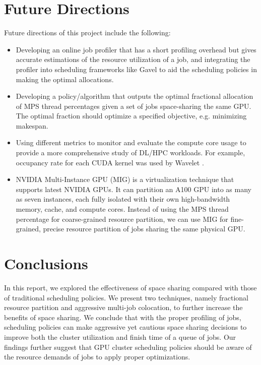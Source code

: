 \documentclass{article}
\begin{document}









\section{Future Directions}

Future directions of this project include the following:
\begin{itemize}
    \item Developing an online job profiler that has a short profiling overhead but gives accurate estimations of the resource utilization of a job, and integrating the profiler into scheduling frameworks like Gavel to aid the scheduling policies in making the optimal allocations.
    \item Developing a policy/algorithm that outputs the optimal fractional allocation of MPS thread percentages given a set of jobs space-sharing the same GPU. The optimal fraction should optimize a specified objective, e.g. minimizing makespan.
    \item Using different metrics to monitor and evaluate the compute core usage to provide a more comprehensive study of DL/HPC workloads. For example, occupancy rate \cite{occupancy} for each CUDA kernel was used by Wavelet \cite{wavelet}.
    \item NVIDIA Multi-Instance GPU (MIG) \cite{mig} is a virtualization technique that supports latest NVIDIA GPUs. It can partition an A100 GPU into as many as seven instances, each fully isolated with their own high-bandwidth memory, cache, and compute cores. Instead of using the MPS thread percentage for coarse-grained resource partition, we can use MIG for fine-grained, precise resource partition of jobs sharing the same physical GPU.
\end{itemize}

\section{Conclusions}

In this report, we explored the effectiveness of space sharing compared with those of traditional scheduling policies. We present two techniques, namely fractional resource partition and aggressive multi-job colocation, to further increase the benefits of space sharing. We conclude that with the proper profiling of jobs, scheduling policies can make aggressive yet cautious space sharing decisions to improve both the cluster utilization and finish time of a queue of jobs. Our findings further suggest that GPU cluster scheduling policies should be aware of the resource demands of jobs to apply proper optimizations.
\end{document}
